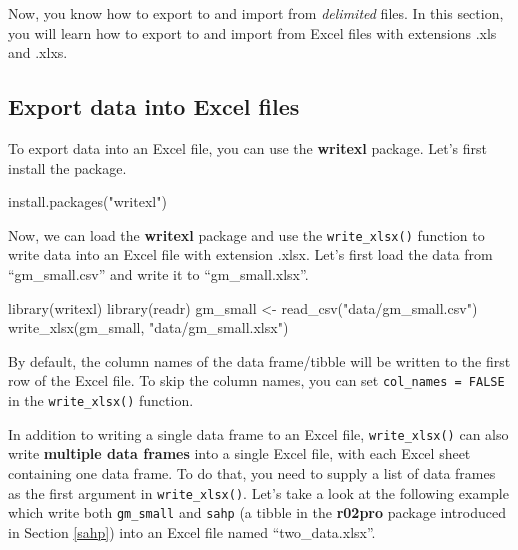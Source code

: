 \documentclass[
]{book}
\newenvironment{Shaded}{\begin{snugshade}}{\end{snugshade}}
\newcommand{\FunctionTok}[1]{\textcolor[rgb]{0.00,0.00,0.00}{#1}}
\newcommand{\NormalTok}[1]{#1}
\newcommand{\OtherTok}[1]{\textcolor[rgb]{0.56,0.35,0.01}{#1}}
\newcommand{\StringTok}[1]{\textcolor[rgb]{0.31,0.60,0.02}{#1}}
\begin{document}
Now, you know how to export to and import from \emph{delimited} files. In this section, you will learn how to export to and import from Excel files with extensions .xls and .xlxs.

\hypertarget{export-data-into-excel-files}{%
\subsection{Export data into Excel files}\label{export-data-into-excel-files}}

To export data into an Excel file, you can use the \textbf{writexl} package. Let's first install the package.

\begin{Shaded}
\begin{Highlighting}[]
\FunctionTok{install.packages}\NormalTok{(}\StringTok{"writexl"}\NormalTok{)}
\end{Highlighting}
\end{Shaded}

Now, we can load the \textbf{writexl} package and use the \texttt{write\_xlsx()} function to write data into an Excel file with extension .xlsx. Let's first load the data from ``gm\_small.csv'' and write it to ``gm\_small.xlsx''.

\begin{Shaded}
\begin{Highlighting}[]
\FunctionTok{library}\NormalTok{(writexl)}
\FunctionTok{library}\NormalTok{(readr)}
\NormalTok{gm\_small }\OtherTok{\textless{}{-}} \FunctionTok{read\_csv}\NormalTok{(}\StringTok{"data/gm\_small.csv"}\NormalTok{)}
\FunctionTok{write\_xlsx}\NormalTok{(gm\_small, }\StringTok{"data/gm\_small.xlsx"}\NormalTok{)}
\end{Highlighting}
\end{Shaded}

By default, the column names of the data frame/tibble will be written to the first row of the Excel file. To skip the column names, you can set \texttt{col\_names\ =\ FALSE} in the \texttt{write\_xlsx()} function.

In addition to writing a single data frame to an Excel file, \texttt{write\_xlsx()} can also write \textbf{multiple data frames} into a single Excel file, with each Excel sheet containing one data frame. To do that, you need to supply a list of data frames as the first argument in \texttt{write\_xlsx()}. Let's take a look at the following example which write both \texttt{gm\_small} and \texttt{sahp} (a tibble in the \textbf{r02pro} package introduced in Section \ref{sahp}) into an Excel file named ``two\_data.xlsx''.
\end{document}
